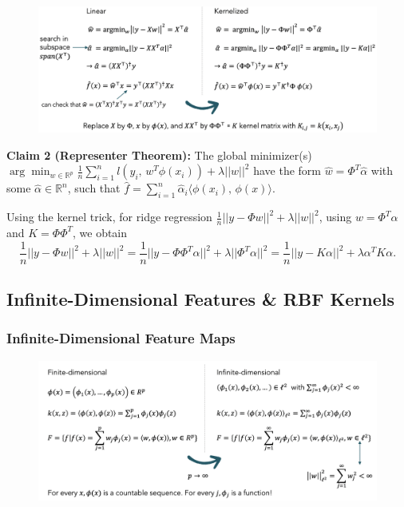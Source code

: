 \documentclass[a4paper]{extarticle}
\begin{document}
\begin{figure}[H]
    \includegraphics[width=15cm]{../images/IntroML_Fig5-1}
    \centering
\end{figure}

\begin{tbox}
    \textbf{Claim 2 (Representer Theorem):} The global minimizer(s) $\arg \min_{w \in \mathbb{R}^p} \frac{1}{n} \sum_{i = 1}^n l(y_i, \, w^T\phi(x_i)) + \lambda ||w||^2$ have the form $\hat{w} = \Phi^T\hat{\alpha}$ with some $\hat{\alpha} \in \mathbb{R}^n$, such that $\hat{f} = \sum_{i = 1}^n \hat{\alpha}_i \langle \phi(x_i), \, \phi(x) \rangle$.
\end{tbox}

Using the kernel trick, for ridge regression $\frac{1}{n}||y - \Phi w||^2 + \lambda ||w||^2$, using $w = \Phi^T\alpha$ and $K = \Phi \Phi^T$, we obtain
\[
    \frac{1}{n}||y - \Phi w||^2 + \lambda||w||^2 = \frac{1}{n}||y - \Phi \Phi^T \alpha ||^2 + \lambda || \Phi^T \alpha ||^2 = \frac{1}{n}||y - K \alpha ||^2 + \lambda \alpha^T K \alpha.
\]

\subsection{Infinite-Dimensional Features \& RBF Kernels}

\subsubsection{Infinite-Dimensional Feature Maps}

\begin{figure}[H]
    \includegraphics[width=15cm]{../images/IntroML_Fig5-2}
    \centering
\end{figure}
\end{document}
